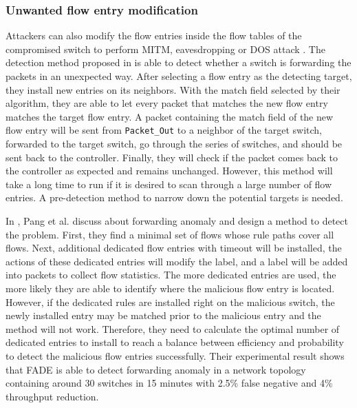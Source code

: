 \documentclass[conference]{IEEEtran}
\begin{document}
\subsubsection{Unwanted flow entry modification}
Attackers can also modify the flow entries inside the flow tables of the compromised switch to perform MITM, eavesdropping or DOS attack \cite{AAS14}. The detection method proposed in \cite{CKGL15} is able to detect whether a switch is forwarding the packets in an unexpected way. After selecting a flow entry as the detecting target, they install new entries on its neighbors. With the match field selected by their algorithm, they are able to let every packet that matches the new flow entry matches the target flow entry. A packet containing the match field of the new flow entry will be sent from \texttt{Packet\_Out} to a neighbor of the target switch, forwarded to the target switch, go through the series of switches, and should be sent back to the controller. Finally, they will check if the packet comes back to the controller as expected and remains unchanged. However, this method will take a long time to run if it is desired to scan through a large number of flow entries. A pre-detection method to narrow down the potential targets is needed.

In \cite{PJL16}, Pang et al. discuss about forwarding anomaly and design a method to detect the problem. First, they find a minimal set of flows whose rule paths cover all flows. Next, additional dedicated flow entries with timeout will be installed, the actions of these dedicated entries will modify the label, and a label will be added into packets to collect flow statistics. The more dedicated entries are used, the more likely they are able to identify where the malicious flow entry is located. However, if the dedicated rules are installed right on the malicious switch, the newly installed entry may be matched prior to the malicious entry and the method will not work. Therefore, they need to calculate the optimal number of dedicated entries to install to reach a balance between efficiency and probability to detect the malicious flow entries successfully. Their experimental result shows that FADE is able to detect forwarding anomaly in a network topology containing around 30 switches in 15 minutes with 2.5\% false negative and 4\% throughput reduction.
\end{document}
